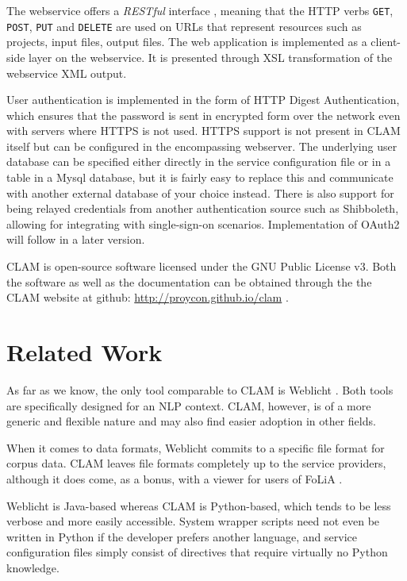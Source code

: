 \documentclass[11pt]{article}
\begin{document}
The webservice offers a \emph{RESTful} interface \cite{REST}, meaning that the HTTP
verbs \texttt{GET}, \texttt{POST}, \texttt{PUT} and \texttt{DELETE} are used on
URLs that represent resources such as projects, input files, output files. The
web application is implemented as a client-side layer on the webservice. It is
presented through XSL transformation \cite{XSLT} of the webservice XML output.

User authentication is implemented in the form of HTTP Digest Authentication,
which ensures that the password is sent in encrypted form over the network even
with servers where HTTPS is not used. HTTPS support is not present in CLAM
itself but can be configured in the encompassing webserver. The underlying user
database can be specified either directly in the service configuration file or
in a table in a Mysql database, but it is fairly easy to replace this and
communicate with another external database of your choice instead. There is
also support for being relayed credentials from another authentication source
such as Shibboleth, allowing for integrating with single-sign-on scenarios.
Implementation of OAuth2 will follow in a later version.

CLAM is open-source software licensed under the GNU Public License v3. Both the
software as well as the documentation can be obtained through the the CLAM
website at github: \url{http://proycon.github.io/clam} .

\section{Related Work}

As far as we know, the only tool comparable to CLAM is Weblicht
\cite{WEBLICHT}. Both tools are specifically designed for an NLP context. CLAM,
however, is of a more generic and flexible nature and may also find easier
adoption in other fields.

When it comes to data formats, Weblicht commits to a specific file format for
corpus data. CLAM leaves file formats completely up to the service providers,
although it does come, as a bonus, with a viewer for users of FoLiA \cite{FOLIA}.

Weblicht is Java-based whereas CLAM is Python-based, which tends to be less
verbose and more easily accessible. System wrapper scripts need not even be
written in Python if the developer prefers another language, and service
configuration files simply consist of directives that require virtually
no Python knowledge.
\end{document}
